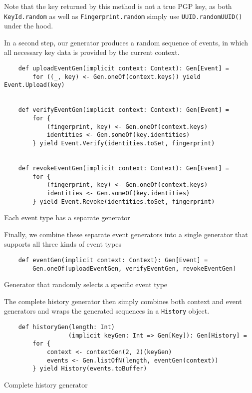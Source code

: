 Note that the key returned by this method is not a true PGP key, as both \texttt{KeyId.random} as well as \texttt{Fingerprint.random} simply use \texttt{UUID.randomUUID()} under the hood. 

In a second step, our generator produces a random sequence of events, in which all necessary key data is provided by the current context.
\begin{code}
    \begin{verbatim}
    def uploadEventGen(implicit context: Context): Gen[Event] =
        for ((_, key) <- Gen.oneOf(context.keys)) yield Event.Upload(key)


    def verifyEventGen(implicit context: Context): Gen[Event] =
        for {
            (fingerprint, key) <- Gen.oneOf(context.keys)
            identities <- Gen.someOf(key.identities)
        } yield Event.Verify(identities.toSet, fingerprint)


    def revokeEventGen(implicit context: Context): Gen[Event] =
        for {
            (fingerprint, key) <- Gen.oneOf(context.keys)
            identities <- Gen.someOf(key.identities)
        } yield Event.Revoke(identities.toSet, fingerprint)
    \end{verbatim}
    \caption{Each event type has a separate generator}
\end{code}


Finally, we combine these separate event generators into a single generator that supports all three kinds of event types
\begin{code}
    \begin{verbatim}
    def eventGen(implicit context: Context): Gen[Event] =
        Gen.oneOf(uploadEventGen, verifyEventGen, revokeEventGen)
    \end{verbatim}
    \caption{Generator that randomly selects a specific event type}
\end{code}


The complete history generator then simply combines both context and event generators and wraps the generated sequences in a \texttt{History} object.
\begin{code}
    \begin{verbatim}
    def historyGen(length: Int)
                  (implicit keyGen: Int => Gen[Key]): Gen[History] =
        for {
            context <- contextGen(2, 2)(keyGen)
            events <- Gen.listOfN(length, eventGen(context))
        } yield History(events.toBuffer)
    \end{verbatim}
    \caption{Complete history generator}
\end{code}

